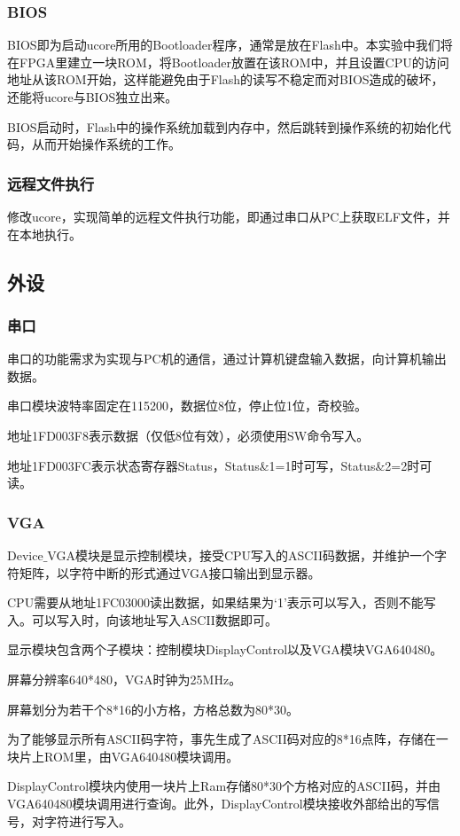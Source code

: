 \subsubsection{BIOS}
BIOS即为启动ucore所用的Bootloader程序，通常是放在Flash中。本实验中我们将在FPGA里建立一块ROM，将Bootloader放置在该ROM中，并且设置CPU的访问地址从该ROM开始，这样能避免由于Flash的读写不稳定而对BIOS造成的破坏，还能将ucore与BIOS独立出来。

BIOS启动时，Flash中的操作系统加载到内存中，然后跳转到操作系统的初始化代码，从而开始操作系统的工作。
\subsubsection{远程文件执行}
修改ucore，实现简单的远程文件执行功能，即通过串口从PC上获取ELF文件，并在本地执行。
\subsection{外设}
\subsubsection{串口}
串口的功能需求为实现与PC机的通信，通过计算机键盘输入数据，向计算机输出数据。

串口模块波特率固定在115200，数据位8位，停止位1位，奇校验。

地址1FD003F8表示数据（仅低8位有效），必须使用SW命令写入。

地址1FD003FC表示状态寄存器Status，Status\&1=1时可写，Status\&2=2时可读。

\subsubsection{VGA}
Device$\_$VGA模块是显示控制模块，接受CPU写入的ASCII码数据，并维护一个字符矩阵，以字符中断的形式通过VGA接口输出到显示器。

CPU需要从地址1FC03000读出数据，如果结果为‘1’表示可以写入，否则不能写入。可以写入时，向该地址写入ASCII数据即可。

显示模块包含两个子模块：控制模块DisplayControl以及VGA模块VGA640480。

屏幕分辨率640*480，VGA时钟为25MHz。

屏幕划分为若干个8*16的小方格，方格总数为80*30。

为了能够显示所有ASCII码字符，事先生成了ASCII码对应的8*16点阵，存储在一块片上ROM里，由VGA640480模块调用。

DisplayControl模块内使用一块片上Ram存储80*30个方格对应的ASCII码，并由VGA640480模块调用进行查询。此外，DisplayControl模块接收外部给出的写信号，对字符进行写入。

